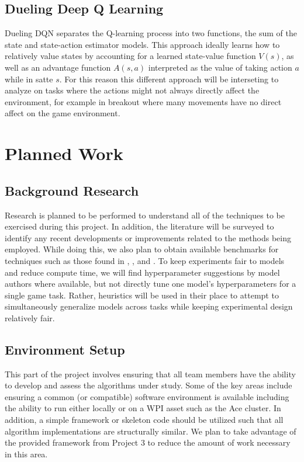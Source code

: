 \documentclass[conference]{IEEEtran}
\begin{document}
\subsection{Dueling Deep Q Learning}
Dueling DQN separates the Q-learning process into two functions, the sum of the state and state-action estimator models. This approach ideally learns how to relatively value states by accounting for a learned state-value function $V(s)$, as well as an advantage function $A(s,a)$ interpreted as the value of taking action $a$ while in satte $s$. For this reason this different approach will be interseting to analyze on tasks where the actions might not always directly affect the environment, for example in breakout where many movements have no direct affect on the game environment.

\section{Planned Work} \label{planned}

\subsection{Background Research}
Research is planned to be performed to understand all of the techniques to be exercised during this project.
In addition, the literature will be surveyed to identify any recent developments or improvements related to the methods being employed.
While doing this, we also plan to obtain available benchmarks for techniques such as those found in \cite{DQNOriginalPaper}, \cite{NatureDeepLearning}, and \cite{bhonker2017playing}.
To keep experiments fair to models and reduce compute time, we will find hyperparameter suggestions by model authors where available, but not directly tune one model's hyperparameters for a single game task. Rather, heuristics will be used in their place to attempt to simultaneously generalize models across tasks while keeping experimental design relatively fair.

\subsection{Environment Setup}
This part of the project involves ensuring that all team members have the ability to develop and assess the algorithms under study.
Some of the key areas include ensuring a common (or compatible) software environment is available including the ability to run \cite{nichol2018retro} either locally or on a WPI asset such as the Ace cluster.
In addition, a simple framework or skeleton code should be utilized such that all algorithm implementations are structurally similar.
We plan to take advantage of the provided framework from Project 3 to reduce the amount of work necessary in this area.
\end{document}
